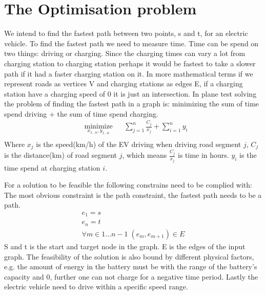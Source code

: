\section{The Optimisation problem}

We intend to find the fastest path between two points, s and t, for an electric vehicle. To find the fastest path we need to measure time. Time can be spend on two things: driving or charging. Since the charging times can vary a lot from charging station to charging station perhaps it would be fastest to take a slower path if it had a faster charging station on it. In more mathematical terms if we represent roads as vertices V and charging stations as edges E, if a charging station have a charging speed of 0 it is just an intersection. In plane test solving the problem of finding the fastest path in a graph is: 
minimizing the sum of time spend driving + the sum of time spend charging. 
\begin{equation}
\begin{aligned}
& \underset{x_{1 \dots n},y_{1 \dots n}}{\text{minimize}}
& & \sum_{j=1}^{n} \frac{C_j}{x_j} + \sum_{i=1}^{n} y_i \\
\end{aligned}
\end{equation}\label{eq:objfunction}
Where $x_j$ is the speed(km/h) of the EV driving when driving road segment $j$, $C_j$ is the distance(km) of road segment $j$, which means $\frac{C_j}{x_j}$ is time in hours. $y_i$ is the time spend at charging station $i$.  

For a solution to be feasible the following constrains need to be complied with: 
The most obvious constraint is the path constraint, the fastest path needs to be a path. 
\begin{gather}
e_1 = s \\
e_n = t \\
\forall{m \in 1 \dots n-1} \; (e_m, e_{m+1}) \in E 
\end{gather}\label{eq:pathconstraint} 
S and  t is the start and target node in the graph. E is the edges of the input graph.  
The feasibility of the solution is also bound by different physical factors, e.g. the amount of energy in the battery must be with the range of the battery's capacity and 0, further one can not charge for a negative time period. Lastly the electric vehicle need to drive within a specific speed range.     

